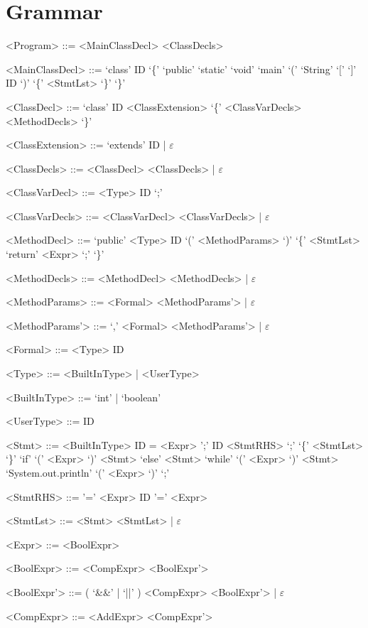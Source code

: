 \documentclass{report}
\begin{document}
\setlength{\grammarparsep}{4pt} %
\setlength{\grammarindent}{12em} %

\section*{Grammar}
\begin{grammar}

<Program> ::= <MainClassDecl> <ClassDecls>

<MainClassDecl> ::= `class' ID `\{' `public' `static' `void' `main' `(' `String' `[' `]' ID `)' `\{' <StmtLst> `\}' `\}'

<ClassDecl> ::= `class' ID <ClassExtension> `\{' <ClassVarDecls> <MethodDecls> `\}'

<ClassExtension> ::= `extends' ID | $\varepsilon$

<ClassDecls> ::= <ClassDecl> <ClassDecls> | $\varepsilon$

<ClassVarDecl> ::= <Type> ID `;'

<ClassVarDecls> ::= <ClassVarDecl> <ClassVarDecls> | $\varepsilon$

<MethodDecl> ::= `public' <Type> ID `(' <MethodParams> `)' `\{' <StmtLst> `return' <Expr> `;' `\}'

<MethodDecls> ::= <MethodDecl> <MethodDecls> | $\varepsilon$

<MethodParams> ::= <Formal> <MethodParams'> | $\varepsilon$

<MethodParams'> ::= `,' <Formal> <MethodParams'> | $\varepsilon$

<Formal> ::= <Type> ID

<Type> ::= <BuiltInType> | <UserType>

<BuiltInType> ::= `int' | `boolean'

<UserType> ::= ID

<Stmt> ::= <BuiltInType> ID = <Expr> ';'
\alt ID <StmtRHS> `;'
\alt `\{' <StmtLst> `\}'
\alt `if' `(' <Expr> `)' <Stmt> `else' <Stmt>
\alt `while' `(' <Expr> `)' <Stmt>
\alt `System.out.println' `(' <Expr> `)' `;'

<StmtRHS> ::= '=' <Expr>
\alt ID '=' <Expr>

<StmtLst> ::= <Stmt> <StmtLst> | $\varepsilon$

<Expr> ::= <BoolExpr>

<BoolExpr> ::= <CompExpr> <BoolExpr'>

<BoolExpr'> ::= ( `&&' | `||' ) <CompExpr> <BoolExpr'> | $\varepsilon$

<CompExpr> ::= <AddExpr> <CompExpr'>


\end{grammar}
\end{document}
